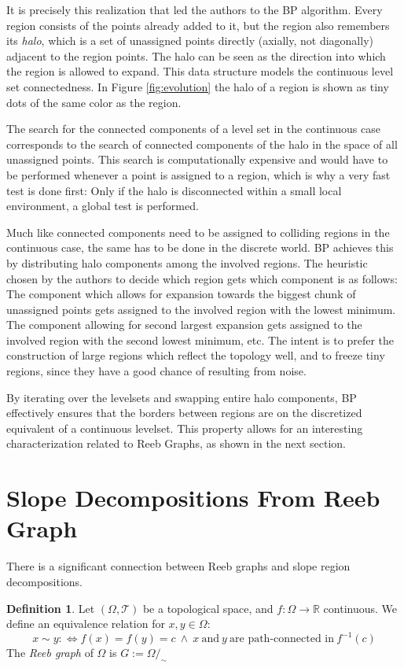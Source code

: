 \documentclass[a4paper,12pt,notitlepage,fullpage]{paper}
\theoremstyle{plain}
\theoremstyle{definition}
\newtheorem{defn}[thm]{Definition} %
\begin{document}
It is precisely this realization that led the authors to the BP algorithm.
Every region consists of the points already added to it, but the region also remembers its \emph{halo}, which is a set of unassigned points directly (axially, not diagonally) adjacent to the region points.
The halo can be seen as the direction into which the region is allowed to expand.
This data structure models the continuous level set connectedness.
In Figure \ref{fig:evolution} the halo of a region is shown as tiny dots of the same color as the region.

The search for the connected components of a level set in the continuous case corresponds to the search of connected components of the halo in the space of all unassigned points.
This search is computationally expensive and would have to be performed whenever a point is assigned to a region, which is why a very fast test is done first:
Only if the halo is disconnected within a small local environment, a global test is performed.

Much like connected components need to be assigned to colliding regions in the continuous case, the same has to be done in the discrete world.
BP achieves this by distributing halo components among the involved regions.
The heuristic chosen by the authors to decide which region gets which component is as follows:
The component which allows for expansion towards the biggest chunk of unassigned points gets assigned to the involved region with the lowest minimum.
The component allowing for second largest expansion gets assigned to the involved region with the second lowest minimum, etc.
The intent is to prefer the construction of large regions which reflect the topology well, and to freeze tiny regions, since they have a good chance of resulting from noise.


By iterating over the levelsets and swapping entire halo components, BP effectively ensures that the borders between regions are on the discretized equivalent of a continuous levelset.
This property allows for an interesting characterization related to Reeb Graphs, as shown in the next section.

\section{Slope Decompositions From Reeb Graph}
\label{sec:reeb}

There is a significant connection between Reeb graphs and slope region decompositions.

\begin{defn}
Let $(\Omega, \mathcal T)$ be a topological space, and $f: \Omega \to \mathbb R$ continuous. We define an equivalence relation for $x,y \in \Omega$: 
\begin{equation*}
x \sim y :\Leftrightarrow f(x) = f(y) = c ~\land ~ x ~\text{and}~ y ~\text{are path-connected in}~ f^{-1}(c)
\end{equation*}
The \emph{Reeb graph} of $\Omega$ is $G := \Omega/_\sim$
\end{defn}
\end{document}
